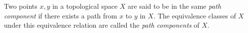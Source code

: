 \documentclass{article}
\begin{document}
Two points $x,y$ in a topological space $X$ are said to be in the same {\em path component} if there exists a path from $x$ to $y$ in $X$. The equivalence classes of $X$ under this equivalence relation are called the {\em path components} of $X$.
\end{document}

